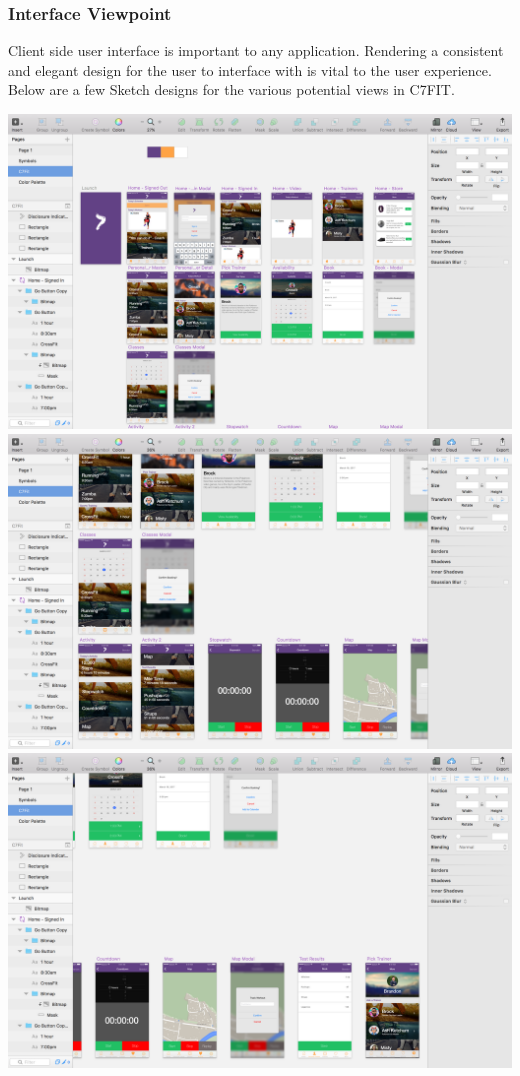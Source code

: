 \documentclass[letterpaper,10pt,titlepage]{article}
\begin{document}
\subsubsection{Interface Viewpoint}
Client side user interface is important to any application. Rendering a consistent and elegant design for the user to interface with is vital to the user experience. Below are a few Sketch designs for the various potential views in C7FIT.

\includegraphics[width=\textwidth]{sketch1.png}\\
\includegraphics[width=\textwidth]{sketch2.png}\\
\includegraphics[width=\textwidth]{sketch3.png}\\
\end{document}
